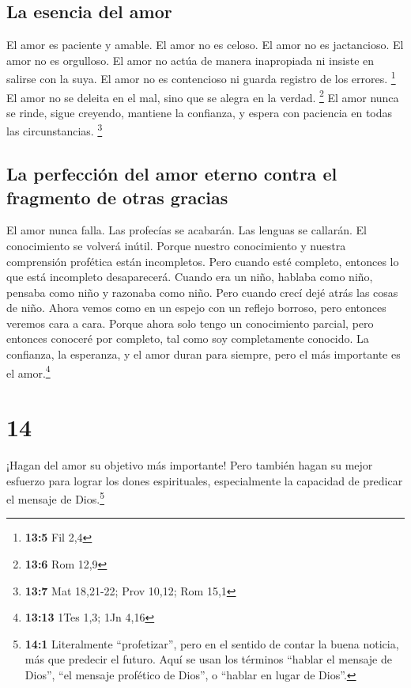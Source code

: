 \hypertarget{la-esencia-del-amor}{%
\subsection{La esencia del amor}\label{la-esencia-del-amor}}

 El amor es paciente y amable. El amor no es celoso. El
amor no es jactancioso. El amor no es orgulloso.  El amor
no actúa de manera inapropiada ni insiste en salirse con la suya. El
amor no es contencioso ni guarda registro de los errores. \footnote{\textbf{13:5}
  Fil 2,4}  El amor no se deleita en el mal, sino que se
alegra en la verdad. \footnote{\textbf{13:6} Rom 12,9}  El
amor nunca se rinde, sigue creyendo, mantiene la confianza, y espera con
paciencia en todas las circunstancias. \footnote{\textbf{13:7} Mat
  18,21-22; Prov 10,12; Rom 15,1}

\hypertarget{la-perfecciuxf3n-del-amor-eterno-contra-el-fragmento-de-otras-gracias}{%
\subsection{La perfección del amor eterno contra el fragmento de otras
gracias}\label{la-perfecciuxf3n-del-amor-eterno-contra-el-fragmento-de-otras-gracias}}

 El amor nunca falla. Las profecías se acabarán. Las
lenguas se callarán. El conocimiento se volverá inútil. 
Porque nuestro conocimiento y nuestra comprensión profética están
incompletos.  Pero cuando esté completo, entonces lo que
está incompleto desaparecerá.  Cuando era un niño,
hablaba como niño, pensaba como niño y razonaba como niño. Pero cuando
crecí dejé atrás las cosas de niño.  Ahora vemos como en
un espejo con un reflejo borroso, pero entonces veremos cara a cara.
Porque ahora solo tengo un conocimiento parcial, pero entonces conoceré
por completo, tal como soy completamente conocido.  La
confianza, la esperanza, y el amor duran para siempre, pero el más
importante es el amor.\footnote{\textbf{13:13} 1Tes 1,3; 1Jn 4,16}

\hypertarget{section-13}{%
\section{14}\label{section-13}}

 ¡Hagan del amor su objetivo más importante! Pero también
hagan su mejor esfuerzo para lograr los dones espirituales,
especialmente la capacidad de predicar el mensaje de Dios.\footnote{\textbf{14:1}
  Literalmente ``profetizar'', pero en el sentido de contar la buena
  noticia, más que predecir el futuro. Aquí se usan los términos
  ``hablar el mensaje de Dios'', ``el mensaje profético de Dios'', o
  ``hablar en lugar de Dios''.}


